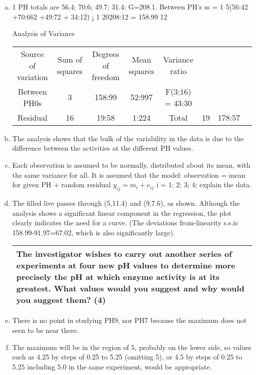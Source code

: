 \documentclass[a4paper,12pt]{article}
\begin{document}
\begin{enumerate}[(a)]
\item 
1 PH totals are 56.4; 70.6; 49.7; 31.4; G=208.1. Between PH’s ss = 1
5(56:42 +70:662 +49:72 +
34:12) ¡ 1
20208:12 = 158:99
12

Analysis of Variance

\begin{center}
\begin{tabular}{|c|c|c|c|c|}
Source of variation&  Sum of squares&  Degrees of freedom &  Mean squares&  Variance ratio \\
Between PH0s & 3&  158:99 & 52:997 &  F(3;16) = 43:30\\
Residual & 16 & 19:58& 1:224&
Total & 19&  178:57&&
\end{tabular}
\end{center}

\item The analysis shows that the bulk of the variability in the data is due to the difference
between the activities at the different PH values.
\item Each observation is assumed to be normally,
distributed about its mean, with the same variance for all. It is assumed that the model:
observation = mean for given PH + random residual $y_{ij} = m_{i} + e_{ij}$ i = 1; 2; 3; 4; explain
the data.
\item The filled live passes through (5,11.4) and (9,7.6), as shown. Although the analysis shows a significant
linear component in the regression, the plot clearly indicates the need for a curve. (The
deviations from-linearity s.s.is 158.99-91.97=67.02, which is also significantly large). 


\begin{table}[ht!]
 \centering
 \begin{tabular}{|p{15cm}|}
 \hline  
 
 
 
The investigator wishes to carry out another series of experiments at four new pH values to determine more precisely the pH at which enzyme activity is at its greatest.  What values would you suggest and why would you suggest them?     (4) 
\\ \hline
  \end{tabular}
\end{table}

\item There is
no point in studying PH9, nor PH7 because the maximum does not seen to be near there.
\item The maximum will be in the region of 5, probably on the lower side, so values such as 4.25
by steps of 0.25 to 5.25 (omitting 5), or 4.5 by steps of 0.25 to 5.25 including 5.0 in the same
experiment, would be appropriate.

\end{enumerate}
\end{document}
